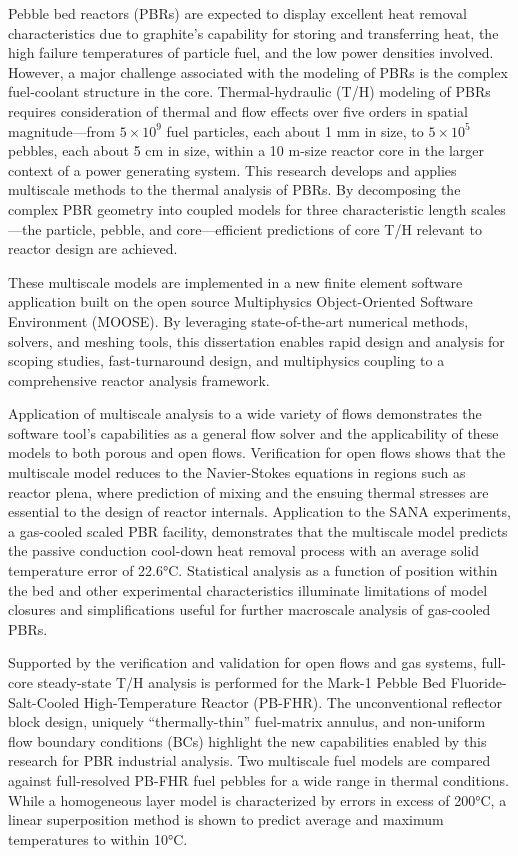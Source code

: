 \documentclass{ucbthesis}
\newcommand{\mdash}
           {\discretionary{}{}{\kern 0.1em}---\discretionary{}{}{\kern 0.1em}}
\begin{document}
\noindent Pebble bed reactors (PBRs) are expected to display excellent heat removal characteristics due to graphite's capability for storing and transferring heat, the high failure temperatures of particle fuel, and the low power densities involved. However, a major challenge associated with the modeling of PBRs is the complex fuel-coolant structure in the core. Thermal-hydraulic (T/H) modeling of PBRs requires consideration of thermal and flow effects over five orders in spatial magnitude\mdash from \(5\times10^9\) fuel particles, each about 1 \si{\milli\meter} in size, to \(5\times10^5\) pebbles, each about 5 \si{\centi\meter} in size, within a 10 \si{\meter}-size reactor core in the larger context of a power generating system. This research develops and applies multiscale methods to the thermal analysis of PBRs. By decomposing the complex PBR geometry into coupled models for three characteristic length scales\mdash the particle, pebble, and core\mdash efficient predictions of core T/H relevant to reactor design are achieved.

These multiscale models are implemented in a new finite element software application built on the open source Multiphysics Object-Oriented Software Environment (MOOSE). By leveraging state-of-the-art numerical methods, solvers, and meshing tools, this dissertation enables rapid design and analysis for scoping studies, fast-turnaround design, and multiphysics coupling to a comprehensive reactor analysis framework. 

Application of multiscale analysis to a wide variety of flows demonstrates the software tool's capabilities as a general flow solver and the applicability of these models to both porous and open flows. Verification for open flows shows that the multiscale model reduces to the Navier-Stokes equations in regions such as reactor plena, where prediction of mixing and the ensuing thermal stresses are essential to the design of reactor internals. Application to the SANA experiments, a gas-cooled scaled PBR facility, demonstrates that the multiscale model predicts the passive conduction cool-down heat removal process with an average solid temperature error of 22.6\si{\celsius}. Statistical analysis as a function of position within the bed and other experimental characteristics illuminate limitations of model closures and simplifications useful for further macroscale analysis of gas-cooled PBRs.

Supported by the verification and validation for open flows and gas systems, full-core steady-state T/H analysis is performed for the Mark-1 Pebble Bed Fluoride-Salt-Cooled High-Temperature Reactor (PB-FHR). The unconventional reflector block design, uniquely ``thermally-thin'' fuel-matrix annulus, and non-uniform flow boundary conditions (BCs) highlight the new capabilities enabled by this research for PBR industrial analysis. Two multiscale fuel models are compared against full-resolved PB-FHR fuel pebbles for a wide range in thermal conditions. While a homogeneous layer model is characterized by errors in excess of 200\si{\celsius}, a linear superposition method is shown to predict average and maximum temperatures to within 10\si{\celsius}. 
\end{document}
